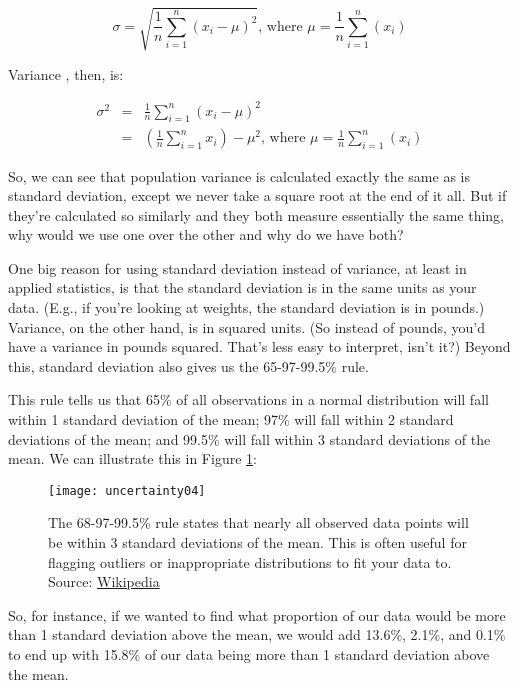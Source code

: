 \begin{equation*}
	\sigma = \sqrt{\frac{1}{n}\sum_{i=1}^n\left(x_i-\mu\right)^2}\text{, where } \mu=\frac{1}{n}\sum_{i=1}^n(x_i)
\end{equation*}

Variance , then, is:

\begin{eqnarray*}
	\sigma^2 &=& \frac{1}{n}\sum_{i=1}^n\left(x_i-\mu\right)^2 \\
	&=& \left(\frac{1}{n}\sum_{i=1}^nx_i\right)-\mu^2\text{, where } \mu=\frac{1}{n}\sum_{i=1}^n(x_i)
\end{eqnarray*}

So, we can see that population variance is calculated exactly the same as is standard deviation, except we never take a square root at the end of it all. But if they're calculated so similarly and they both measure essentially the same thing, why would we use one over the other and why do we have both?

One big reason for using standard deviation instead of variance, at least in applied statistics, is that the standard deviation is in the same units as your data. (E.g., if you're looking at weights, the standard deviation is in pounds.) Variance, on the other hand, is in squared units. (So instead of pounds, you'd have a variance in pounds squared. That's less easy to interpret, isn't it?) Beyond this, standard deviation also gives us the 65-97-99.5\% rule.

This rule tells us that 65\% of all observations in a normal distribution will fall within 1 standard deviation of the mean; 97\% will fall within 2 standard deviations of the mean; and 99.5\% will fall within 3 standard deviations of the mean. We can illustrate this in Figure \ref{fig:uncertainty04}:

\begin{figure}[h!]
\texttt{[image: uncertainty04]}
\caption{The 68-97-99.5\% rule states that nearly all observed data points will be within 3 standard deviations of the mean. This is often useful for flagging outliers or inappropriate distributions to fit your data to. Source: \href{http://en.wikipedia.org/wiki/Standard_deviation}{Wikipedia}}
\label{fig:uncertainty04}
\end{figure}

So, for instance, if we wanted to find what proportion of our data would be more than 1 standard deviation above the mean, we would add 13.6\%, 2.1\%, and 0.1\% to end up with 15.8\% of our data being more than 1 standard deviation above the mean.

